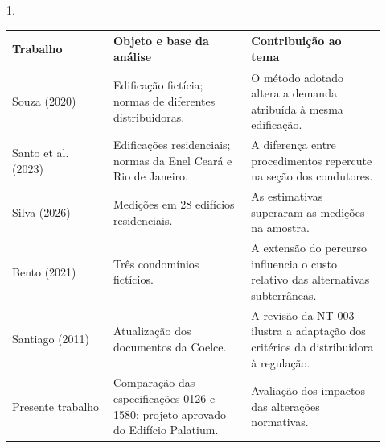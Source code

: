 \begin{quadro}[!hbp]
  \centering
  \begin{Spacing}{1.}
    \caption{Síntese dos trabalhos relacionados}
    \label{qua:trabalhos-relacionados}
  \end{Spacing}
  {\small
  \renewcommand{\arraystretch}{1.2}
  \setlength{\tabcolsep}{4pt}
  \begin{tabular}{|>{\raggedright\arraybackslash}p{0.25\linewidth}|>{\raggedright\arraybackslash}p{0.34\linewidth}|>{\raggedright\arraybackslash}p{0.33\linewidth}|}
    \hline
    \textbf{Trabalho} & \textbf{Objeto e base da análise} & \textbf{Contribuição ao tema} \\\hline
    Souza (2020) & Edificação fictícia; normas de diferentes distribuidoras. & O método adotado altera a demanda atribuída à mesma edificação. \\\hline
    Santo et al. (2023) & Edificações residenciais; normas da Enel Ceará e Rio de Janeiro. & A diferença entre procedimentos repercute na seção dos condutores. \\\hline
    Silva (2026) & Medições em 28 edifícios residenciais. & As estimativas superaram as medições na amostra. \\\hline
    Bento (2021) & Três condomínios fictícios. & A extensão do percurso influencia o custo relativo das alternativas subterrâneas. \\\hline
    Santiago (2011) & Atualização dos documentos da Coelce. & A revisão da NT-003 ilustra a adaptação dos critérios da distribuidora à regulação. \\\hline
    Presente trabalho & Comparação das especificações 0126 e 1580; projeto aprovado do Edifício Palatium. & Avaliação dos impactos das alterações normativas. \\\hline
  \end{tabular}}
\end{quadro}

